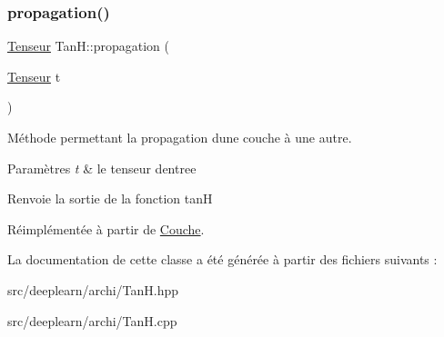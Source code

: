 \subsubsection{\texorpdfstring{propagation()}{propagation()}}
{\footnotesize\ttfamily \hyperlink{classTenseur}{Tenseur} Tan\+H\+::propagation (\begin{DoxyParamCaption}\item[{\hyperlink{classTenseur}{Tenseur}}]{t }\end{DoxyParamCaption})\hspace{0.3cm}{\ttfamily [virtual]}}



Méthode permettant la propagation d\textquotesingle{}une couche à une autre. 


\begin{DoxyParams}{Paramètres}
{\em t} & le tenseur d\textquotesingle{}entree \\
\hline
\end{DoxyParams}
\begin{DoxyReturn}{Renvoie}
la sortie de la fonction tanH 
\end{DoxyReturn}


Réimplémentée à partir de \hyperlink{classCouche_a1f0ed59e21020f5d4f37933af4d1b1e5}{Couche}.



La documentation de cette classe a été générée à partir des fichiers suivants \+:\begin{DoxyCompactItemize}
\item 
src/deeplearn/archi/Tan\+H.\+hpp\item 
src/deeplearn/archi/Tan\+H.\+cpp\end{DoxyCompactItemize}
